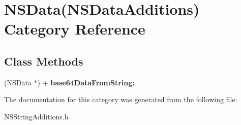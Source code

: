 \hypertarget{category_n_s_data_07_n_s_data_additions_08}{\section{N\+S\+Data(N\+S\+Data\+Additions) Category Reference}
\label{category_n_s_data_07_n_s_data_additions_08}
}
\subsection*{Class Methods}
\begin{DoxyCompactItemize}
\item 
\hypertarget{category_n_s_data_07_n_s_data_additions_08_aa6d45d3f9e31b79ec68fb14d7440d7e4}{(N\+S\+Data $\ast$) + {\bfseries base64\+Data\+From\+String\+:}}\label{category_n_s_data_07_n_s_data_additions_08_aa6d45d3f9e31b79ec68fb14d7440d7e4}

\end{DoxyCompactItemize}


The documentation for this category was generated from the following file\+:\begin{DoxyCompactItemize}
\item 
N\+S\+String\+Additions.\+h\end{DoxyCompactItemize}
